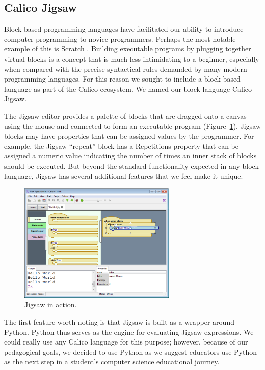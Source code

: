 \documentclass[preprint]{sigplanconf}
\begin{document}
\subsection{Calico Jigsaw}

Block-based programming languages have facilitated our ability to
introduce computer programming to novice programmers. Perhaps the most
notable example of this is Scratch \cite{scratch}. Building
executable programs by plugging together virtual blocks is a concept
that is much less intimidating to a beginner, especially when
compared with the precise syntactical rules demanded by many modern
programming languages. For this reason we sought to include a
block-based language as part of the Calico ecosystem. We named our
block language Calico Jigsaw.

The Jigsaw editor provides a palette of blocks that are dragged onto a
canvas using the mouse and connected to form an executable program
(Figure~\ref{jigsaw1}). Jigsaw blocks may have properties that can be assigned
values by the programmer. For example, the Jigsaw ``repeat'' block has
a Repetitions property that can be assigned a numeric value indicating
the number of times an inner stack of blocks should be executed. But
beyond the standard functionality expected in any block language,
Jigsaw has several additional features that we feel make it unique.

\begin{figure}[h!]
  \centering
     \includegraphics[width=75mm]{jigsaw1.eps}
  \caption{Jigsaw in action.}
  \label{jigsaw1}
\end{figure}

The first feature worth noting is that Jigsaw is built as a wrapper
around Python. Python thus serves as the engine for evaluating Jigsaw
expressions. We could really use any Calico language for this purpose;
however, because of our pedagogical goals, we decided to use Python as
we suggest educators use Python as the next step in a student's
computer science educational journey.
\end{document}
